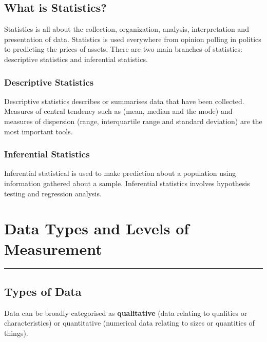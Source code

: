 \documentclass[
]{book}
\begin{document}
\hypertarget{what-is-statistics}{%
\section{What is Statistics?}\label{what-is-statistics}}

Statistics is all about the collection, organization, analysis, interpretation and presentation of data. Statistics is used everywhere from opinion polling in politics to predicting the prices of assets. There are two main branches of statistics: descriptive statistics and inferential statistics.

\hypertarget{descriptive-statistics}{%
\subsection{Descriptive Statistics}\label{descriptive-statistics}}

Descriptive statistics describes or summarises data that have been collected. Measures of central tendency such as (mean, median and the mode) and measures of dispersion (range, interquartile range and standard deviation) are the most important tools.

\hypertarget{inferential-statistics}{%
\subsection{Inferential Statistics}\label{inferential-statistics}}

Inferential statistical is used to make prediction about a population using information gathered about a sample. Inferential statistics involves hypothesis testing and regression analysis.

\hypertarget{data-types-and-levels-of-measurement}{%
\chapter{Data Types and Levels of Measurement}\label{data-types-and-levels-of-measurement}}

\begin{center}\rule{0.5\linewidth}{0.5pt}\end{center}

\hypertarget{types-of-data}{%
\section{Types of Data}\label{types-of-data}}

Data can be broadly categorised as \textbf{qualitative} (data relating to qualities or characteristics) or quantitative (numerical data relating to sizes or quantities of things).
\end{document}
